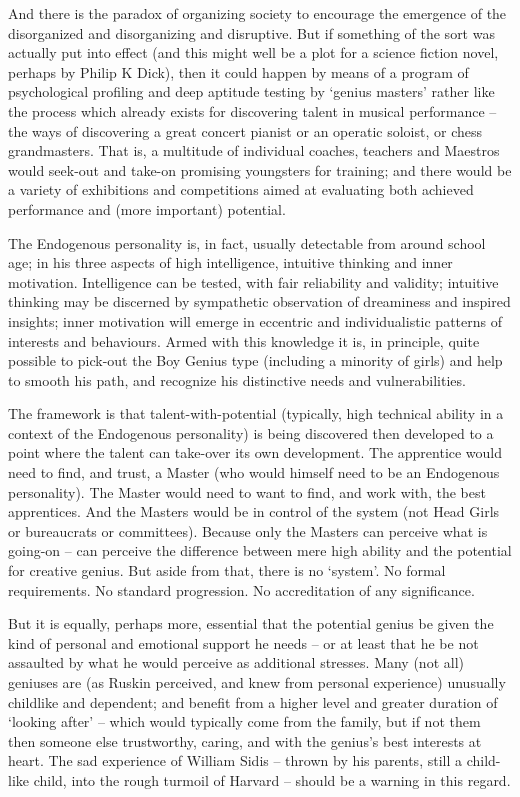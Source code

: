 \documentclass[
]{book}
\begin{document}
And there is the paradox of organizing society to encourage the emergence of the disorganized and disorganizing and disruptive. But if something of the sort was actually put into effect (and this might well be a plot for a science fiction novel, perhaps by Philip K Dick), then it could happen by means of a program of psychological profiling and deep aptitude testing by `genius masters' rather like the process which already exists for discovering talent in musical performance -- the ways of discovering a great concert pianist or an operatic soloist, or chess grandmasters. That is, a multitude of individual coaches, teachers and Maestros would seek-out and take-on promising youngsters for training; and there would be a variety of exhibitions and competitions aimed at evaluating both achieved performance and (more important) potential.

The Endogenous personality is, in fact, usually detectable from around school age; in his three aspects of high intelligence, intuitive thinking and inner motivation. Intelligence can be tested, with fair reliability and validity; intuitive thinking may be discerned by sympathetic observation of dreaminess and inspired insights; inner motivation will emerge in eccentric and individualistic patterns of interests and behaviours. Armed with this knowledge it is, in principle, quite possible to pick-out the Boy Genius type (including a minority of girls) and help to smooth his path, and recognize his distinctive needs and vulnerabilities.

The framework is that talent-with-potential (typically, high technical ability in a context of the Endogenous personality) is being discovered then developed to a point where the talent can take-over its own development. The apprentice would need to find, and trust, a Master (who would himself need to be an Endogenous personality). The Master would need to want to find, and work with, the best apprentices. And the Masters would be in control of the system (not Head Girls or bureaucrats or committees). Because only the Masters can perceive what is going-on -- can perceive the difference between mere high ability and the potential for creative genius. But aside from that, there is no `system'. No formal requirements. No standard progression. No accreditation of any significance.

But it is equally, perhaps more, essential that the potential genius be given the kind of personal and emotional support he needs -- or at least that he be not assaulted by what he would perceive as additional stresses. Many (not all) geniuses are (as Ruskin perceived, and knew from personal experience) unusually childlike and dependent; and benefit from a higher level and greater duration of `looking after' -- which would typically come from the family, but if not them then someone else trustworthy, caring, and with the genius's best interests at heart. The sad experience of William Sidis -- thrown by his parents, still a child-like child, into the rough turmoil of Harvard -- should be a warning in this regard.
\end{document}
